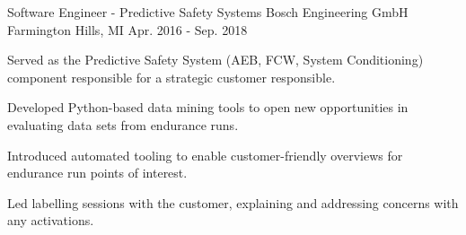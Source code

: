 \begin{cventries}
  \cventry
    {Software Engineer - Predictive Safety Systems} %
    {Bosch Engineering GmbH} %
    {Farmington Hills, MI} %
    {Apr. 2016 - Sep. 2018} %
    {
      \begin{cvitems} %
        \item {Served as the Predictive Safety System (AEB, FCW, System Conditioning) component responsible for a strategic customer responsible.}
        \item {Developed Python-based data mining tools to open new opportunities in evaluating data sets from endurance runs.}
        \item {Introduced automated tooling to enable customer-friendly overviews for endurance run points of interest.}
        \item {Led labelling sessions with the customer, explaining and addressing concerns with any activations.}
      \end{cvitems}
    }


\end{cventries}
